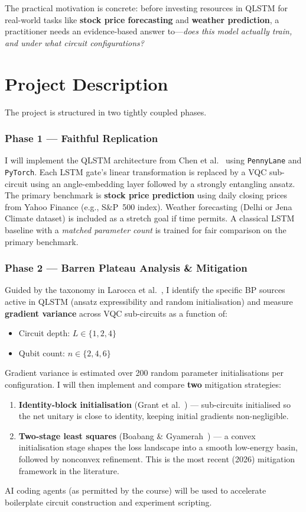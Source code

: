 \documentclass[10pt,twocolumn]{article}
\begin{document}
The practical motivation is concrete: before investing resources in QLSTM for real-world tasks like \textbf{stock price forecasting} and \textbf{weather prediction}, a practitioner needs an evidence-based answer to---\emph{does this model actually train, and under what circuit configurations?}


\section{Project Description}

The project is structured in two tightly coupled phases.

\subsubsection*{Phase 1 — Faithful Replication}
I will implement the QLSTM architecture from Chen et al.~\cite{chen2020qlstm} using \texttt{PennyLane} and \texttt{PyTorch}. Each LSTM gate's linear transformation is replaced by a VQC sub-circuit using an angle-embedding layer followed by a strongly entangling ansatz. The primary benchmark is \textbf{stock price prediction} using daily closing prices from Yahoo Finance (e.g., S\&P~500 index). Weather forecasting (Delhi or Jena Climate dataset) is included as a stretch goal if time permits. A classical LSTM baseline with a \emph{matched parameter count} is trained for fair comparison on the primary benchmark.

\subsubsection*{Phase 2 — Barren Plateau Analysis \& Mitigation}
Guided by the taxonomy in Larocca et al.~\cite{larocca2024review}, I identify the specific BP sources active in QLSTM (ansatz expressibility and random initialisation) and measure \textbf{gradient variance} across VQC sub-circuits as a function of:
\begin{itemize}
  \item Circuit depth: $L \in \{1, 2, 4\}$
  \item Qubit count: $n \in \{2, 4, 6\}$
\end{itemize}
Gradient variance is estimated over 200 random parameter initialisations per configuration. I will then implement and compare \textbf{two} mitigation strategies:
\begin{enumerate}
  \item \textbf{Identity-block initialisation} (Grant et al.~\cite{grant2019init}) — sub-circuits initialised so the net unitary is close to identity, keeping initial gradients non-negligible.
  \item \textbf{Two-stage least squares} (Boabang \& Gyamerah~\cite{boabang2026twostage}) — a convex initialisation stage shapes the loss landscape into a smooth low-energy basin, followed by nonconvex refinement. This is the most recent (2026) mitigation framework in the literature.
\end{enumerate}
AI coding agents (as permitted by the course) will be used to accelerate boilerplate circuit construction and experiment scripting.
\end{document}
